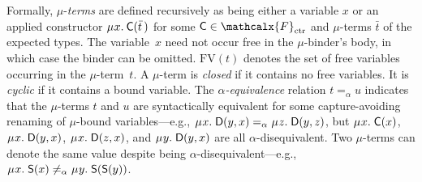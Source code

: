 \documentclass[letter]{article}
\newcommand\MU{\vvthinspace\mu\vvthinspace}
\theoremstyle{plain}
\theoremstyle{definition}
\newcommand\FV{\mathrm{FV}}
\newcommand\const[1]{\textsf{#1}}
\renewcommand{\vec}[1]{\bar #1}
\newcommand{\rn}[1]{\textsf{#1}}
\newcommand{\aequiv}{\mathrel{=_\alpha}}
\newcommand\Types{\mathcalx{Y}}
\newcommand\Funcs{\mathcalx{F}}
\newcommand\Codata{\Types_{\mathrm{codt}}}
\newcommand\Nondata{\Types_{\mathrm{ord}}}
\newcommand\Ctr{\Funcs_{\smash{\mathrm{ctr}}}}
\newcommand\vvthinspace{\kern+0.041667em}
\begin{document}
Formally, $\mu$-\emph{terms} are defined recursively as being either a variable $x$
or an applied constructor
$\MU x.\: \const{C}( \vec t\, )$ for some $\const{C} \in \Ctr$ and
$\mu$-terms $\vec t$ of the expected types.
The variable~$x$ need not occur free in the $\mu$-binder's body, in which case
the binder can be omitted.
$\FV( t )$ denotes the set of free variables occurring in the $\mu$-term~$t$.
A $\mu$-term is \emph{closed} if %
it contains no free variables. It is \emph{cyclic} if %
it contains a bound variable. The $\alpha$\emph{-equiv\-alence} relation $t \aequiv u$
indicates that the $\mu$-terms $t$ and $u$
are syntactically equivalent for some capture-avoiding renaming of $\mu$-bound variables---e.g.,
$\MU x.\; \const{D}( y, x ) \aequiv \MU z.\; \const{D}( y, z )$,
but
$\MU x.\; \const{C}( x )$, $\MU x.\; \const{D}( y, x )$, $\MU x.\; \const{D}( z, x )$,
and $\MU y.\; \const{D}( y, x )$ are all $\alpha$-disequivalent.
Two $\mu$-terms can denote the same value despite being $\alpha$-disequivalent---e.g.,
$\MU x.\; \const{S}( x ) \not\aequiv \MU y.\; \const{S}( \const{S}( y ) )$.


%
%
%
\end{document}
